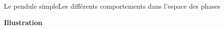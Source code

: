 \documentclass[usenames,dvipsnames,svgnames,10pt,aspectratio=169]{beamer}
\begin{document}
\begin{frame}[t, c]{Le pendule simple}{Les différents comportements dans l'espace des phases}
\begin{minipage}{.225\textwidth}
	\end{minipage}
\end{frame}

\begin{frame}[t, c]{}{}

	\centering

	{\Large \textbf{Illustration}}

	\bigskip


	\vspace{-2cm}
\end{frame}
\end{document}

